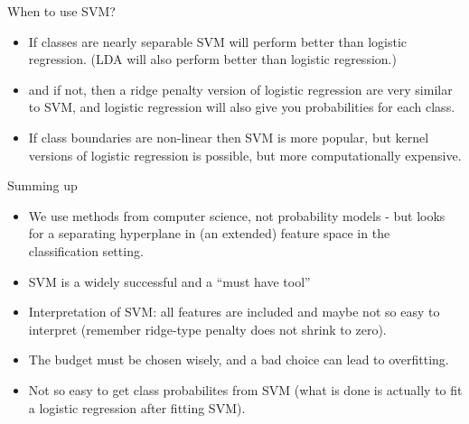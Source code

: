 \documentclass[ignorenonframetext,]{beamer}
\providecommand{\tightlist}{%
  \setlength{\itemsep}{0pt}\setlength{\parskip}{0pt}}
\begin{document}
\begin{frame}

\begin{block}{When to use SVM?}

\begin{itemize}
\tightlist
\item
  If classes are nearly separable SVM will perform better than logistic
  regression. (LDA will also perform better than logistic regression.)
\item
  and if not, then a ridge penalty version of logistic regression are
  very similar to SVM, and logistic regression will also give you
  probabilities for each class.
\item
  If class boundaries are non-linear then SVM is more popular, but
  kernel versions of logistic regression is possible, but more
  computationally expensive.
\end{itemize}

\end{block}

\end{frame}

\begin{frame}{ Summing up }

\end{frame}

\begin{frame}

\begin{itemize}
\tightlist
\item
  We use methods from computer science, not probability models - but
  looks for a separating hyperplane in (an extended) feature space in
  the classification setting.
\item
  SVM is a widely successful and a ``must have tool''
\item
  Interpretation of SVM: all features are included and maybe not so easy
  to interpret (remember ridge-type penalty does not shrink to zero).
\item
  The budget must be chosen wisely, and a bad choice can lead to
  overfitting.
\item
  Not so easy to get class probabilites from SVM (what is done is
  actually to fit a logistic regression after fitting SVM).
\end{itemize}

\end{frame}
\end{document}
